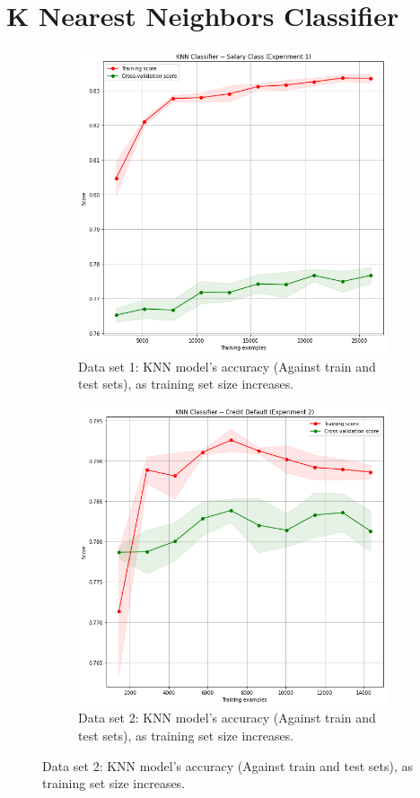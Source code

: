 \documentclass[
	letterpaper, %
]{IEEEtran}
\begin{document}
	\section{K Nearest Neighbors Classifier}
		\begin{figure}[h]
			\begin{subfigure}{.5\textwidth}
				\centering
				\includegraphics[width=.8\linewidth]{./images/knnExp1.png}
				\caption{Data set 1: KNN model's accuracy (Against train and test sets), as training set size increases.}
				\label{fig:knnExp1}
			\end{subfigure}
			\begin{subfigure}{.5\textwidth}
				\centering
				\includegraphics[width=.8\linewidth]{./images/knnExp2.png}
				\caption{Data set 2: KNN model's accuracy (Against train and test sets), as training set size increases.}
				\label{fig:knnExp2}
			\end{subfigure}
		\end{figure}
	
\end{document}
